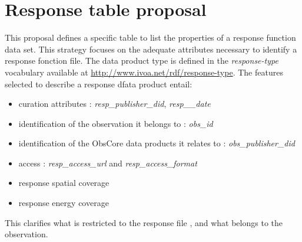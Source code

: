 
\newpage

\section*{Response table  proposal}

This  proposal defines a specific table to list the properties of a response function data set. 
This strategy focuses on the adequate attributes necessary to identify a response fonction file. 
The data product type is defined in the \emph{response-type} vocabulary available at 
\url{http://www.ivoa.net/rdf/response-type}. 
The features selected to describe a response dfata product entail: 
\begin{itemize}
\item curation attributes : \emph{resp\_publisher\_did}, \emph{resp\_\_date}
\item identification of the observation it belongs to : \emph{obs\_id}
\item identification of the ObsCore data products it relates to : \emph{obs\_publisher\_did}
\item access : \emph{resp\_access\_url} and \emph{resp\_access\_format}
\item response spatial coverage
\item response energy coverage
\end{itemize}

This clarifies what is restricted to the response file , and what belongs to the observation. 

